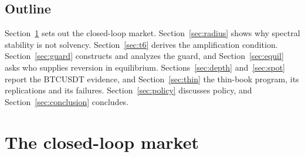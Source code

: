 \documentclass[12pt]{article}
\theoremstyle{definition}
\theoremstyle{remark}
\begin{document}
\subsection{Outline}
Section~\ref{sec:model} sets out the closed-loop market. Section~\ref{sec:radius} shows why spectral stability is not solvency. Section~\ref{sec:t6} derives the amplification condition. Section~\ref{sec:guard} constructs and analyzes the guard, and Section~\ref{sec:equil} asks who supplies reversion in equilibrium. Sections~\ref{sec:depth} and~\ref{sec:spot} report the BTCUSDT evidence, and Section~\ref{sec:thin} the thin-book program, its replications and its failures. Section~\ref{sec:policy} discusses policy, and Section~\ref{sec:conclusion} concludes.
\section{The closed-loop market}\label{sec:model}
\end{document}
